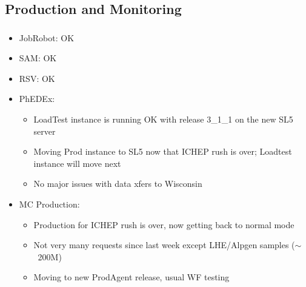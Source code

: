 \documentclass{beamer}
\newcommand{\ca}{\ensuremath{\sim}}
\begin{document}
\subsection{Production and Monitoring}
\begin{frame}
\frametitle{}

\begin{itemize}
	\item JobRobot: OK
	\item SAM: OK
	\item RSV: OK
	\item PhEDEx:
	\begin{itemize}
		\item LoadTest instance is running OK with release 3\_1\_1 on the new SL5 server 
		\item Moving Prod instance to SL5 now that ICHEP rush is over; Loadtest instance will move next
		\item No major issues with data xfers to Wisconsin
	\end{itemize}
	\item MC Production:
	\begin{itemize}
		\item Production for ICHEP rush is over, now getting back to normal mode
		\item Not very many requests since last week except LHE/Alpgen samples (\ca{}~200M)
		\item Moving to new ProdAgent release, usual WF testing
	\end{itemize}
\end{itemize}
\end{frame}
\end{document}

